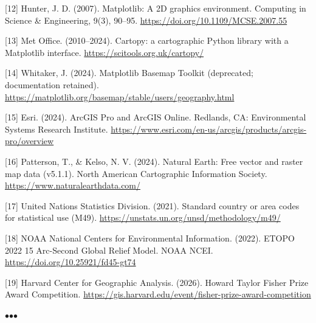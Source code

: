 \documentclass[11pt]{article}
\newcommand{\sectionbreak}{%
  \par\nobreak\vspace{0.8em}%
  \par\centerline{\textcolor{black!40}{$\bullet$\quad$\bullet$\quad$\bullet$}}%
  \par\vspace{0.6em}\nobreak%
}
\begin{document}
[12] Hunter, J. D. (2007). Matplotlib: A 2D graphics environment. Computing in Science \& Engineering, 9(3), 90–95. \url{https://doi.org/10.1109/MCSE.2007.55}


[13] Met Office. (2010–2024). Cartopy: a cartographic Python library with a Matplotlib interface. \url{https://scitools.org.uk/cartopy/}


[14] Whitaker, J. (2024). Matplotlib Basemap Toolkit (deprecated; documentation retained). \url{https://matplotlib.org/basemap/stable/users/geography.html}


[15] Esri. (2024). ArcGIS Pro and ArcGIS Online. Redlands, CA: Environmental Systems Research Institute. \url{https://www.esri.com/en-us/arcgis/products/arcgis-pro/overview}


[16] Patterson, T., \& Kelso, N. V. (2024). Natural Earth: Free vector and raster map data (v5.1.1). North American Cartographic Information Society. \url{https://www.naturalearthdata.com/}


[17] United Nations Statistics Division. (2021). Standard country or area codes for statistical use (M49). \url{https://unstats.un.org/unsd/methodology/m49/}


[18] NOAA National Centers for Environmental Information. (2022). ETOPO 2022 15 Arc-Second Global Relief Model. NOAA NCEI. \url{https://doi.org/10.25921/fd45-gt74}


[19] Harvard Center for Geographic Analysis. (2026). Howard Taylor Fisher Prize Award Competition. \url{https://gis.harvard.edu/event/fisher-prize-award-competition}


\sectionbreak
\end{document}
